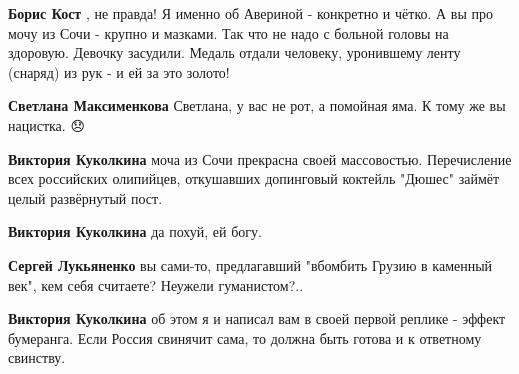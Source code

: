 \begin{itemize}
\begin{itemize}
\textbf{Борис Кост} , не правда! Я именно об Авериной - конкретно и чётко. А вы
про мочу из Сочи - крупно и мазками. Так что не надо с больной головы на
здоровую. Девочку засудили. Медаль отдали человеку, уронившему ленту (снаряд)
из рук - и ей за это золото!


\textbf{Светлана Максименкова} Светлана, у вас не рот, а помойная яма. К тому же вы нацистка. 😞

 
\textbf{Виктория Куколкина} моча из Сочи прекрасна своей массовостью. Перечисление всех российских олипийцев, откушавших допинговый коктейль "Дюшес" займёт целый развёрнутый пост.

 
\textbf{Виктория Куколкина}
да похуй, ей богу.

 
\textbf{Сергей Лукьяненко} вы сами-то, предлагавший "вбомбить Грузию в каменный век", кем себя считаете? Неужели гуманистом?..

 
\textbf{Виктория Куколкина} об этом я и написал вам в своей первой реплике -
эффект бумеранга. Если Россия свинячит сама, то должна быть готова и к
ответному свинству.

 

\end{itemize}
\end{itemize}
